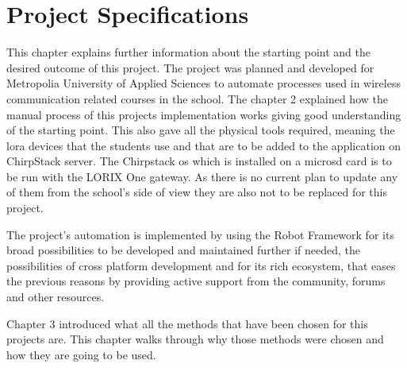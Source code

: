 
\chapter{Project Specifications} \label{ch:project_spec}
This chapter explains further information about the starting point and the desired outcome of this project.
The project was planned and developed for Metropolia University of Applied Sciences to automate processes used in wireless communication related courses in the school.
The chapter 2 explained how the manual process of this projects implementation works giving good understanding of the starting point.
This also gave all the physical tools required, meaning the \gls{lora} devices that the students use and that are to be added to the application on ChirpStack server.
The Chirpstack \gls{os} which is installed on a micro\gls{sd} card is to be run with the LORIX One gateway.
As there is no current plan to update any of them from the school's side of view they are also not to be replaced for this project.

The project's automation is implemented by using the Robot Framework for its broad possibilities to be developed and maintained further if needed, the possibilities of cross platform development and for its rich ecosystem, that eases the previous reasons by providing active support from the community, forums and other resources.

Chapter 3 introduced what all the methods that have been chosen for this projects are.
This chapter walks through why those methods were chosen and how they are going to be used.


\clearpage %
